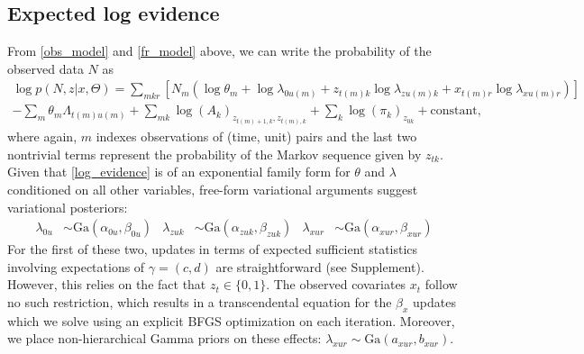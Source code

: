 \documentclass{article} %
\begin{document}
\subsection{Expected log evidence}
From \ref{obs_model} and \ref{fr_model} above, we can write the probability of the observed data $N$ as
\begin{multline}
    \label{log_evidence}
    \log p(N, z|x, \Theta) = \sum_{mkr} \left[ 
        N_m \left( \log \theta_m +
            \log \lambda_{0u(m)} +
            z_{t(m) k} \log \lambda_{zu(m) k} + 
            x_{t(m) r} \log \lambda_{xu(m) r}
            \right)
    \right] \\
    - \sum_m \theta_m \Lambda_{t(m) u(m)} + 
    \sum_{mk} \log (A_k)_{z_{t(m)+1, k}, z_{t(m), k}} + 
    \sum_k \log (\pi_k)_{z_{0k}} + \text{constant,}
\end{multline}
where again, $m$ indexes observations of (time, unit) pairs and the last two nontrivial terms represent the probability of the Markov sequence given by $z_{tk}$. Given that \ref{log_evidence} is of an exponential family form for $\theta$ and $\lambda$ conditioned on all other variables, free-form variational arguments \cite{Blei2006-oh} suggest variational posteriors:
\begin{align}
    \lambda_{0u} &\sim \text{Ga}(\alpha_{0u}, \beta_{0u}) &
    \lambda_{zuk} &\sim \text{Ga}(\alpha_{zuk}, \beta_{zuk}) &
    \lambda_{xur} &\sim \text{Ga}(\alpha_{xur}, \beta_{xur})
\end{align}
For the first of these two, updates in terms of expected sufficient statistics involving expectations of $\gamma = (c, d)$ are straightforward (see Supplement). However, this relies on the fact that $z_t \in \lbrace0, 1\rbrace$. The observed covariates $x_t$ follow no such restriction, which results in a transcendental equation for the $\beta_x$ updates which we solve using an explicit BFGS optimization on each iteration. Moreover, we place non-hierarchical Gamma priors on these effects: $\lambda_{xur} \sim \text{Ga}(a_{xur}, b_{xur})$.
\end{document}
